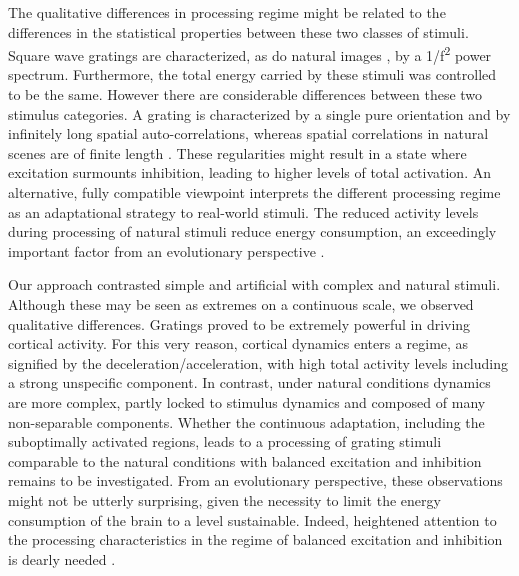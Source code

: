 The qualitative differences in processing regime might be related to the
differences in the statistical properties between these two classes of
stimuli. Square wave gratings are characterized, as do natural images
\citep{field1987a, ruderman1994a, schaaf1996a, torralba2003a, betsch2004a},
by a 1/f\textsuperscript{2} power spectrum. Furthermore, the total energy
carried by these stimuli was controlled to be the same. However there are
considerable differences between these two stimulus categories. A grating
is characterized by a single pure orientation and by infinitely long
spatial auto-correlations, whereas spatial correlations in natural scenes
are of finite length \citep{betsch2004a}. These regularities might result
in a state where excitation surmounts inhibition, leading to higher levels
of total activation. An alternative, fully compatible viewpoint interprets
the different processing regime as an adaptational strategy to real-world
stimuli. The reduced activity levels during processing of natural stimuli
reduce energy consumption, an exceedingly important factor from an
evolutionary perspective \citep{laughlin1998a, lennie2003a}. 

Our approach contrasted simple and artificial with complex and natural
stimuli.  Although these may be seen as extremes on a continuous scale, we
observed qualitative differences. Gratings proved to be extremely powerful
in driving cortical activity. For this very reason, cortical dynamics
enters a regime, as signified by the deceleration/acceleration, with high
total activity levels including a strong unspecific component. In contrast,
under natural conditions dynamics are more complex, partly locked to
stimulus dynamics and composed of many non-separable components. Whether
the continuous adaptation, including the suboptimally activated regions,
leads to a processing of grating stimuli comparable to the natural
conditions with balanced excitation and inhibition remains to be
investigated. From an evolutionary perspective, these observations might
not be utterly surprising, given the necessity to limit the energy
consumption of the brain to a level sustainable. Indeed, heightened
attention to the processing characteristics in the regime of balanced
excitation and inhibition is dearly needed \citep{felsen2005b}. 
